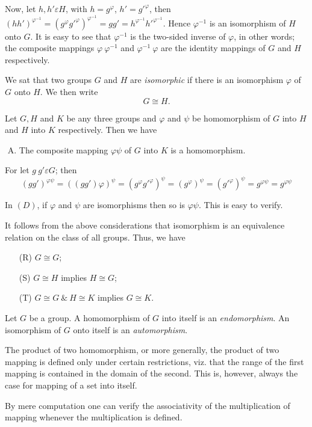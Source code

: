 Now, let $h, h' \varepsilon H$, with $h = g^\varphi$, $h' =
g{'}^{\varphi}$, then $(hh')^{\varphi^{-1}} = (g^\varphi
g{'}^\varphi)^{\varphi^{-1}} = gg' = h^{\varphi^{-1}}
h{'}^{\varphi^{-1}}$. Hence $\varphi^{-1}$ is an isomorphism of $H$
onto $G$. It is easy to see that $\varphi^{-1}$ is the two-sided
inverse of $\varphi$, in other words; the composite mappings $\varphi
~ \varphi^{-1}$ and $\varphi^{-1} ~ \varphi$ are the identity mappings
of $G$ and $H$ respectively. 

We sat that two groups $G$ and $H$ are \textit{isomorphic} if there is
an isomorphism $\varphi$ of $G$ onto $H$. We then write 
$$
G \cong H. 
$$

Let $G, H$ and $K$ be any three groups and $\varphi$ and $\psi$ be
homomorphism of $G$ into $H$ and $H$ into $K$ respectively. Then we
have  
\begin{enumerate}[(D)]
\item The composite mapping $\varphi \psi$ of $G$ into $K$ is a homomorphism. 
\end{enumerate}

For let $g ~ g' \varepsilon G$; then
$$
(gg')^{\varphi \psi} = ((gg')\varphi)^\psi = (g^\varphi g{'}^\varphi
)^\psi = (g^\varphi)^\psi = (g{'}^\varphi )^\psi = g^{\varphi \psi} =
g^{\varphi \psi} 
$$

In $(D)$, if $\varphi$ and $\psi$ are isomorphisms then so is $\varphi
\psi$. This is easy to verify. 

It follows from the above considerations that isomorphism is an
equivalence relation on the class of all groups. Thus, we have  
\begin{enumerate}
\item[(R)] $G \cong G$;
\item[(S)] $G \cong H$ implies $H \cong G$;
\item[(T)] $G \cong G ~ \& ~ H \cong K$ implies $G \cong K$.
\end{enumerate}

Let $G$ be a group. A homomorphism of $G$ into itself is an
\textit{endomorphism}. An isomorphism of $G$ onto itself is an
\textit{automorphism}.  

The product of two homomorphism, or more generally, the product of two
mapping is defined only under certain restrictions, viz. that the
range of the first mapping is contained in the domain of the
second. This is, however, always the case for mapping of a set into
itself. 

By mere computation one can verify the associativity of the
multiplication of mapping whenever the multiplication is defined. 


